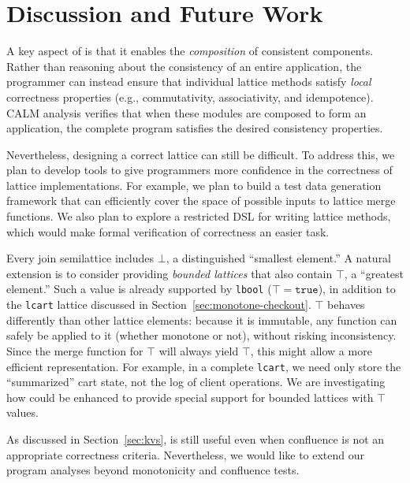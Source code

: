 \section{Discussion and Future Work}
\label{sec:discussion}
A key aspect of \lang is that it enables the \emph{composition} of consistent
components. Rather than reasoning about the consistency of an entire
application, the programmer can instead ensure that individual lattice methods
satisfy \emph{local} correctness properties (e.g., commutativity, associativity,
and idempotence). CALM analysis verifies that when these modules are composed to
form an application, the complete program satisfies the desired consistency
properties.

Nevertheless, designing a correct lattice can still be difficult. To address
this, we plan to develop tools to give programmers more confidence in the
correctness of lattice implementations. For example, we plan to build a test
data generation framework that can efficiently cover the space of possible
inputs to lattice merge functions. We also plan to explore a restricted DSL for
writing lattice methods, which would make formal verification of correctness an
easier task.

Every join semilattice includes $\bot$, a distinguished ``smallest element.'' A
natural extension is to consider providing \emph{bounded lattices} that also
contain $\top$, a ``greatest element.'' Such a value is already supported by
\texttt{lbool} ($\top = \mathtt{true}$), in addition to the \texttt{lcart}
lattice discussed in Section~\ref{sec:monotone-checkout}. $\top$ behaves
differently than other lattice elements: because it is immutable, any function
can safely be applied to it (whether monotone or not), without risking
inconsistency. Since the merge function for $\top$ will always yield $\top$,
this might allow a more efficient representation.  For example, in a complete
\texttt{lcart}, we need only store the ``summarized'' cart state, not the log of
client operations. We are investigating how \lang could be enhanced to provide
special support for bounded lattices with $\top$ values.

As discussed in Section~\ref{sec:kvs}, \lang is still useful even when
confluence is not an appropriate correctness criteria. Nevertheless, we would
like to extend our program analyses beyond monotonicity and confluence
tests. 

